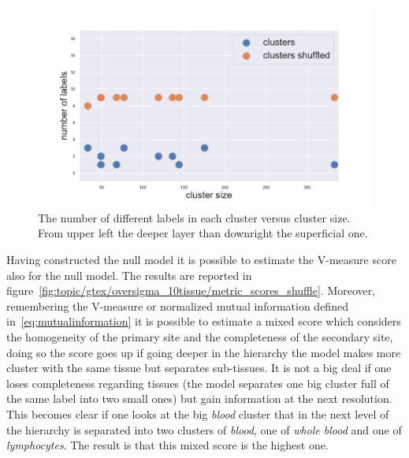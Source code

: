 \begin{figure}[htb!]
\begin{minipage}{0.45\textwidth}
    \end{minipage}
    \hspace{3mm}
    \begin{minipage}{0.45\textwidth}
    \includegraphics[width=0.9\linewidth]{pictures/topic/gtex/oversigma_10tissue/shuffledcluster_shuffle_label_size_l3_primary_site.pdf}
    \end{minipage}
\caption{The number of different labels in each cluster versus cluster size. From upper left the deeper layer than downright the superficial one.}
\label{fig:topic/gtex/oversigma_10tissue/shuffledcluster_shuffle_label_size_lall}
\end{figure}
\FloatBarrier
Having constructed the null model it is possible to estimate the V-measure score also for the null model. The results are reported in figure~\ref{fig:topic/gtex/oversigma_10tissue/metric_scores_shuffle}. 
Moreover, remembering the V-measure or normalized mutual information defined in~\ref{eq:mutualinformation} it is possible to estimate a mixed score which considers the homogeneity of the primary site and the completeness of the secondary site, doing so the score goes up if going deeper in the hierarchy the model makes more cluster with the same tissue but separates sub-tissues. It is not a big deal if one loses completeness regarding tissues (the model separates one big cluster full of the same label into two small ones) but gain information at the next resolution. This becomes clear if one looks at the big \textit{blood} cluster that in the next level of the hierarchy is separated into two clusters of \textit{blood}, one of \textit{whole blood} and one of \textit{lymphocytes}. The result is that this mixed score is the highest one.
